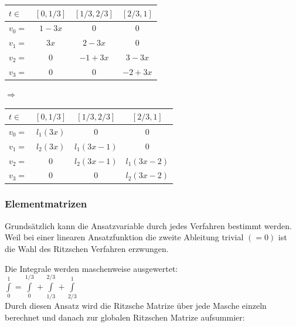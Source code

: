 \begin{minipage}{8cm}
	\begin{tabular}{lc|c|c}
	$t\in$&$[0,1/3]$&$[1/3,2/3]$&$[2/3,1]$\\
	\hline
	$v_0=$&$1-3x$&$0$&$0$\\
	$v_1=$&$3x$&$2-3x$&$0$\\
	$v_2=$&$0$&$-1+3x$&$3-3x$\\
	$v_3=$&$0$&$0$&$-2+3x$\\
	\end{tabular}
\end{minipage}
\hfill
\begin{minipage}{2cm}
$\Longrightarrow$
\end{minipage}
\hfill
\begin{minipage}{8cm}
	\begin{tabular}{lc|c|c}
	$t\in$&$[0,1/3]$&$[1/3,2/3]$&$[2/3,1]$\\
	\hline
	$v_0=$&$l_1(3x)$&$0$&$0$\\
	$v_1=$&$l_2(3x)$&$l_1(3x-1)$&$0$\\
	$v_2=$&$0$&$l_2(3x-1)$&$l_1(3x-2)$\\
	$v_3=$&$0$&$0$&$l_2(3x-2)$\\
	\end{tabular}
\end{minipage}
\subsubsection{Elementmatrizen}
Grundsätzlich kann die Ansatzvariable durch jedes Verfahren bestimmt werden.
Weil bei einer linearen Ansatzfunktion die zweite Ableitung trivial $(=0)$ ist die Wahl des Ritzschen Verfahren erzwungen.

Die Integrale werden maschenweise ausgewertet:\\

 $\int\limits_{0}^{1}{}=\int\limits_{0}^{1/3}{}+\int\limits_{1/3}^{2/3}{}+\int\limits_{2/3}^{1}{}$\\
 
Durch diesen Ansatz wird die Ritzsche Matrize über jede Masche einzeln berechnet und danach zur globalen Ritzschen Matrize aufsummier:\\

